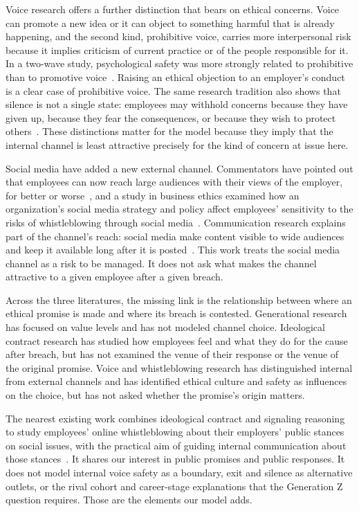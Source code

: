 Voice research offers a further distinction that bears on ethical concerns. Voice can promote a new idea or it can object to something harmful that is already happening, and the second kind, prohibitive voice, carries more interpersonal risk because it implies criticism of current practice or of the people responsible for it. In a two-wave study, psychological safety was more strongly related to prohibitive than to promotive voice~\citep{liang2012psychological}. Raising an ethical objection to an employer's conduct is a clear case of prohibitive voice. The same research tradition also shows that silence is not a single state: employees may withhold concerns because they have given up, because they fear the consequences, or because they wish to protect others~\citep{vandyne2003conceptualizing}. These distinctions matter for the model because they imply that the internal channel is least attractive precisely for the kind of concern at issue here.

Social media have added a new external channel. Commentators have pointed out that employees can now reach large audiences with their views of the employer, for better or worse~\citep{miles2014employee}, and a study in business ethics examined how an organization's social media strategy and policy affect employees' sensitivity to the risks of whistleblowing through social media~\citep{xiao2022employee}. Communication research explains part of the channel's reach: social media make content visible to wide audiences and keep it available long after it is posted~\citep{treem2013social}. This work treats the social media channel as a risk to be managed. It does not ask what makes the channel attractive to a given employee after a given breach.

\medskip

Across the three literatures, the missing link is the relationship between where an ethical promise is made and where its breach is contested. Generational research has focused on value levels and has not modeled channel choice. Ideological contract research has studied how employees feel and what they do for the cause after breach, but has not examined the venue of their response or the venue of the original promise. Voice and whistleblowing research has distinguished internal from external channels and has identified ethical culture and safety as influences on the choice, but has not asked whether the promise's origin matters.

The nearest existing work combines ideological contract and signaling reasoning to study employees' online whistleblowing about their employers' public stances on social issues, with the practical aim of guiding internal communication about those stances~\citep{yang2026managing}. It shares our interest in public promises and public responses. It does not model internal voice safety as a boundary, exit and silence as alternative outlets, or the rival cohort and career-stage explanations that the Generation Z question requires. Those are the elements our model adds.
